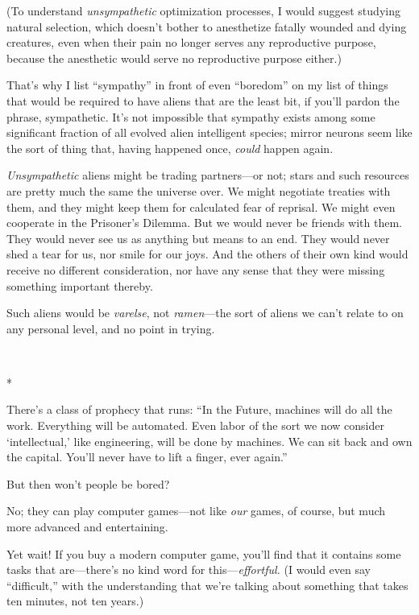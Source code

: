 {
 (To understand \textit{unsympathetic} optimization processes, I
would suggest studying natural selection, which doesn't
bother to anesthetize fatally wounded and dying creatures, even when
their pain no longer serves any reproductive purpose, because the
anesthetic would serve no reproductive purpose either.)}

{
 That's why I list
``sympathy'' in front of even
``boredom'' on my list of things
that would be required to have aliens that are the least bit, if
you'll pardon the phrase, sympathetic.
It's not impossible that sympathy exists among some
significant fraction of all evolved alien intelligent species; mirror
neurons seem like the sort of thing that, having happened once,
\textit{could} happen again.}

{
 \textit{Unsympathetic} aliens might be trading partners---or not;
stars and such resources are pretty much the same the universe over. We
might negotiate treaties with them, and they might keep them for
calculated fear of reprisal. We might even cooperate in the
Prisoner's Dilemma. But we would never be friends with
them. They would never see us as anything but means to an end. They
would never shed a tear for us, nor smile for our joys. And the others
of their own kind would receive no different consideration, nor have
any sense that they were missing something important thereby.}

{
 Such aliens would be \textit{varelse}, not \textit{ramen}{}---the
sort of aliens we can't relate to on any personal
level, and no point in trying.}

{\centering
 \ ~
\par}

{\centering
 *
\par}


{
 There's a class of prophecy that runs:
``In the Future, machines will do all the work.
Everything will be automated. Even labor of the sort we now consider
`intellectual,' like engineering, will
be done by machines. We can sit back and own the capital.
You'll never have to lift a finger, ever
again.'' }

{
 But then won't people be bored?}

{
 No; they can play computer games---not like \textit{our} games, of
course, but much more advanced and entertaining.}

{
 Yet wait! If you buy a modern computer game,
you'll find that it contains some tasks that
are---there's no kind word for
this---\textit{effortful.} (I would even say
``difficult,'' with the
understanding that we're talking about something that
takes ten minutes, not ten years.)}

